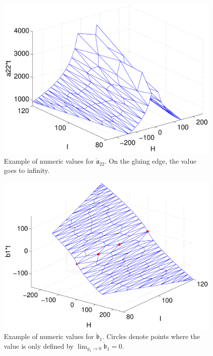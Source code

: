 \begin{figure}
\begin{center}
\includegraphics[width=\textwidth*7/8]{figures/a22_circ}
\caption{Example of numeric values for $\mathring{\mathfrak a}_{22}$. On the gluing edge, the value goes to infinity.}
\label{F:a22_circ}
\end{center}
\end{figure}
\begin{figure}
\begin{center}
\includegraphics[width=\textwidth*7/8]{figures/b1_circ}
\caption{Example of numeric values for $\mathring{\mathfrak b}_1$. Circles denote points where the value is only defined by $\lim_{y_1 \to 0} \mathring{\mathfrak b}_1 = 0$.}
\label{F:b1_circ}
\end{center}
\end{figure}

